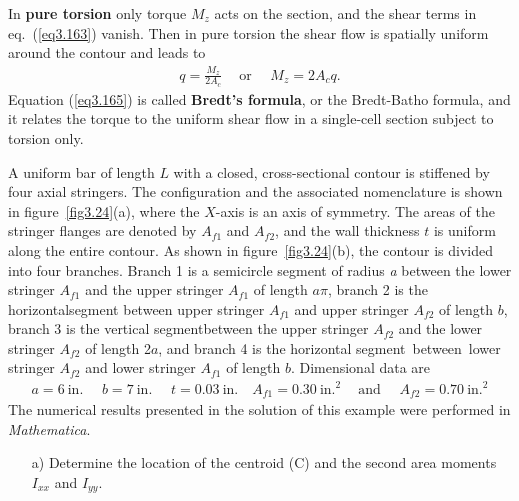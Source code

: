\documentclass{AeroStructure-ERJohnson}
\begin{document}
\vspace*{-1pc}

 In \textbf{pure torsion} only torque $M_z$ acts on the section, and the shear terms in eq.~(\ref{eq3.163}) vanish. Then in pure torsion the shear flow is spatially uniform around the contour and leads to
\begin{align}\label{eq3.165}
q=\frac{M_{z}}{2 A_{c}} \quad~\text{or } \quad M_{z}=2 A_{c} q.
\end{align}
Equation (\ref{eq3.165}) is called \textbf{Bredt's formula}, or the Bredt-Batho formula, and it relates the torque to the uniform shear flow in a single-cell section subject to torsion only.

\clearpage

\begin{example*}\label{ex3.4}\setcounter{equation}{0}\def\theequation{\alph{equation}}A uniform bar of length $L$ with a closed, cross-sectional contour is stiffened by four axial stringers. The configuration and the associated nomenclature is shown in figure~\ref{fig3.24}(a), where the $X$-axis is an axis of symmetry. The areas of the stringer flanges are denoted by $A_{f1}$ and $A_{f2}$, and the wall thickness $t$ is uniform along the entire contour. As shown in figure~\ref{fig3.24}(b), the contour is divided into four branches. Branch 1 is a semicircle segment of radius \textit{a} between the lower stringer $A_{f1}$ and the upper stringer $A_{f1}$ of length $a\pi$, branch 2 is the horizontal\break segment between upper stringer $A_{f1}$ and upper stringer $A_{f2}$ of length $b$, branch 3 is the vertical segment\break between the upper stringer $A_{f2}$ and the lower stringer $A_{f2}$ of length 2$a$, and branch 4 is the horizontal segment~bet\-ween~lower stringer $A_{f2}$ and lower stringer $A_{f1}$ of length $b$. Dimensional data are
\begin{align*}
a=6~\text{in. } \quad b=7~\text{in. } \quad t=0.03~\text{in.} \quad A_{f 1}=0.30~\text{in.}^{2} \quad~\text{and } \quad A_{f 2}=0.70~\text{in.}^{2}
\end{align*}
The numerical results presented in the solution of this example were performed in \textit{Mathematica}.
{\def\thefigure{3.24}
}
\begin{enumerate}
\item[a)] Determine the location of the centroid (C) and the second area moments $I_{x x}$ and $I_{y y}$.


\end{enumerate}
\end{example*}
\end{document}
